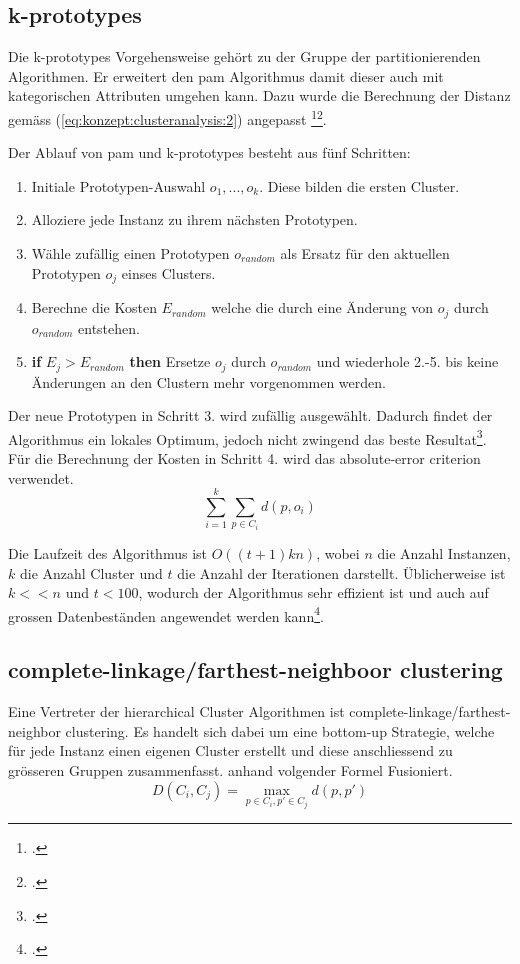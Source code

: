 
\subsection{k-prototypes}
Die k-prototypes Vorgehensweise gehört zu der Gruppe der partitionierenden Algorithmen. Er erweitert den \gls{pam} Algorithmus damit dieser auch mit kategorischen Attributen umgehen kann. Dazu wurde die Berechnung der Distanz gemäss (\ref{eq:konzept:clusteranalysis:2}) angepasst \footcite{data_mining_concepts_and_techniques}\footcite{clustering_numeric_and_categorical_values}.


Der Ablauf von \gls{pam} und k-prototypes besteht aus fünf Schritten:
\begin{enumerate}
\item Initiale Prototypen-Auswahl ${o_1,...,o_k}$. Diese bilden die ersten Cluster.
\item Alloziere jede Instanz zu ihrem nächsten Prototypen.
\item Wähle zufällig einen Prototypen $o_{random}$ als Ersatz für den aktuellen Prototypen $o_j$ einses Clusters.
\item Berechne die Kosten $E_{random}$ welche die durch eine Änderung von $o_j$ durch $o_{random}$ entstehen.
\item \textbf{if} $E_j > E_{random}$ \textbf{then} Ersetze $o_j$ durch $o_{random}$ und wiederhole 2.-5. bis keine Änderungen an den Clustern mehr vorgenommen werden.
\end{enumerate}


Der neue Prototypen in Schritt 3. wird zufällig ausgewählt. Dadurch findet der Algorithmus ein lokales Optimum, jedoch nicht zwingend das beste Resultat\footcite{data_mining_concepts_and_techniques}.
Für die Berechnung der Kosten in Schritt 4. wird das absolute-error criterion verwendet.
\begin{equation}
\sum_{i=1}^{k} \sum_{p \in C_i} d(p, o_i)
\end{equation}

Die Laufzeit des Algorithmus ist $O((t+1)kn)$, wobei $n$ die Anzahl Instanzen, $k$ die Anzahl Cluster und $t$ die Anzahl der Iterationen darstellt. Üblicherweise ist $k << n$ und $t < 100$, wodurch der Algorithmus sehr effizient ist und auch auf grossen Datenbeständen angewendet werden kann\footcite{clustering_numeric_and_categorical_values}.

\subsection{complete-linkage/farthest-neighboor clustering}
Eine Vertreter der hierarchical Cluster Algorithmen ist complete-linkage/farthest-neighbor clustering. Es handelt sich dabei um eine bottom-up Strategie, welche für jede Instanz einen eigenen Cluster erstellt und diese anschliessend zu grösseren Gruppen zusammenfasst. anhand volgender Formel Fusioniert. 
\begin{equation}
D(C_i, C_j) = \max_{p \in C_i, p' \in C_j} d(p, p')
\end{equation}